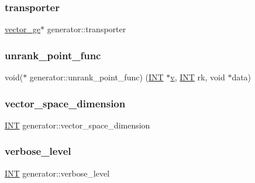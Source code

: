 \mbox{\label{classgenerator_a93919c2acbe661d0942063a1922ec4b3}} 
\subsubsection{\texorpdfstring{transporter}{transporter}}
{\footnotesize\ttfamily \mbox{\hyperlink{classvector__ge}{vector\+\_\+ge}}$\ast$ generator\+::transporter}

\mbox{\label{classgenerator_ac82befb4c6d7c74c375257c25bb2baa8}} 
\subsubsection{\texorpdfstring{unrank\+\_\+point\+\_\+func}{unrank\_point\_func}}
{\footnotesize\ttfamily void($\ast$ generator\+::unrank\+\_\+point\+\_\+func) (\mbox{\hyperlink{galois_8h_a09fddde158a3a20bd2dcadb609de11dc}{I\+NT}} $\ast$\mbox{\hyperlink{simeon_8_c_aeb3f3030944801b163bc3b829a7f6710}{v}}, \mbox{\hyperlink{galois_8h_a09fddde158a3a20bd2dcadb609de11dc}{I\+NT}} rk, void $\ast$data)}

\mbox{\label{classgenerator_ae80aa53bf6e4d56b01c29e8f3c6fd241}} 
\subsubsection{\texorpdfstring{vector\+\_\+space\+\_\+dimension}{vector\_space\_dimension}}
{\footnotesize\ttfamily \mbox{\hyperlink{galois_8h_a09fddde158a3a20bd2dcadb609de11dc}{I\+NT}} generator\+::vector\+\_\+space\+\_\+dimension}

\mbox{\label{classgenerator_a7fedc6488314cbc00dbfcc42d311e1ce}} 
\subsubsection{\texorpdfstring{verbose\+\_\+level}{verbose\_level}}
{\footnotesize\ttfamily \mbox{\hyperlink{galois_8h_a09fddde158a3a20bd2dcadb609de11dc}{I\+NT}} generator\+::verbose\+\_\+level}

